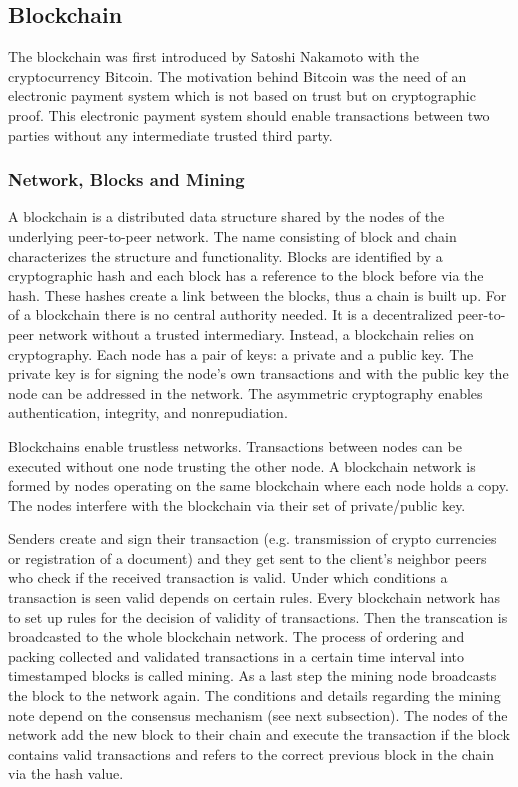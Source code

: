 \documentclass[conference]{IEEEtran}
\begin{document}
\subsection{Blockchain}
The blockchain was first introduced by Satoshi Nakamoto with the cryptocurrency Bitcoin. The motivation behind Bitcoin was the need of an electronic payment system which is not based on trust but on cryptographic proof. This electronic payment system should enable transactions between two parties without any intermediate trusted third party.\cite{Nakamoto2008}
\subsubsection{Network, Blocks and Mining}
A blockchain is a distributed data structure shared by the nodes of the underlying peer-to-peer network. The name consisting of block and chain characterizes the structure and functionality. Blocks are identified by a cryptographic hash and each block has a reference to the block before via the hash. These hashes create a link between the blocks, thus a chain is built up.
For of a blockchain there is no central authority needed. It is a decentralized peer-to-peer network without a trusted intermediary. Instead, a blockchain relies on cryptography. Each node has a pair of keys: a private and a public key. The private key is for signing the node's own transactions and with the public key the node can be addressed in the network. The asymmetric cryptography enables authentication, integrity, and nonrepudiation.\par
Blockchains enable trustless networks. Transactions between nodes can be executed without one node trusting the other node. A blockchain network is formed by nodes operating on the same blockchain where each node holds a copy. The nodes interfere with the blockchain via their set of private/public key.\cite{Christidis2016} \par
Senders create and sign their transaction (e.g. transmission of crypto currencies or registration of a document) and they get sent to the client's neighbor peers who check if the received transaction is valid. Under which conditions a transaction is seen valid depends on certain rules. Every blockchain network has to set up rules for the decision of validity of transactions. Then the transcation is broadcasted to the whole blockchain network. The process of ordering and packing collected and validated transactions in a certain time interval into timestamped blocks is called mining. As a last step the mining node broadcasts the block to the network again. The conditions and details regarding the mining note depend on the consensus mechanism (see next subsection). The nodes of the network add the new block to their chain and execute the transaction if the block contains valid transactions and refers to the correct previous block in the chain via the hash value.\cite{Christidis2016}\cite{Prinz2017}\par
\end{document}
